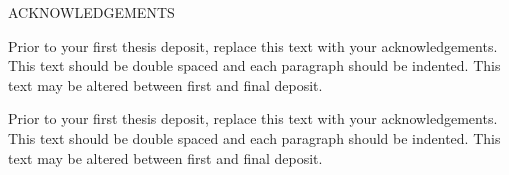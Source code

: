 \begin{doublespace}
\begin{tightcenter}
ACKNOWLEDGEMENTS
\mylinespacing
\end{tightcenter}

Prior to your first thesis deposit, replace this text with your acknowledgements.  This text should be double spaced and each paragraph should be indented.  This text may be altered between first and final deposit.

Prior to your first thesis deposit, replace this text with your acknowledgements.  This text should be double spaced and each paragraph should be indented.  This text may be altered between first and final deposit.  
\mylinespacing
\begin{tightcenter}
\end{tightcenter}
\end{doublespace}
